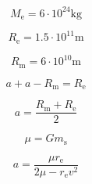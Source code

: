 \documentclass{article}
\begin{document}
$$M_\textrm{e} = 6\cdot10^{24} \textrm{kg}$$

$$R_\textrm{e} = 1.5\cdot10^{11} \textrm{m}$$

$$R_\textrm{m} = 6\cdot10^{10} \textrm{m}$$

$$a + a - R_\textrm{m} = R_\textrm{e}$$

$$a = \frac{R_\textrm{m} + R_\textrm{e}}{2}$$

$$\mu = G m_\textrm{s}$$

$$a = \frac{\mu r_\textrm{e}}{2 \mu - r_\textrm{e} v^2}$$
\end{document}

